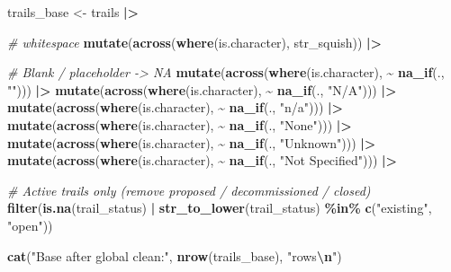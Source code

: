 \documentclass[
]{article}
\newenvironment{Shaded}{\begin{snugshade}}{\end{snugshade}}
\newcommand{\CommentTok}[1]{\textcolor[rgb]{0.56,0.35,0.01}{\textit{#1}}}
\newcommand{\FunctionTok}[1]{\textcolor[rgb]{0.13,0.29,0.53}{\textbf{#1}}}
\newcommand{\NormalTok}[1]{#1}
\newcommand{\OtherTok}[1]{\textcolor[rgb]{0.56,0.35,0.01}{#1}}
\newcommand{\SpecialCharTok}[1]{\textcolor[rgb]{0.81,0.36,0.00}{\textbf{#1}}}
\newcommand{\StringTok}[1]{\textcolor[rgb]{0.31,0.60,0.02}{#1}}
\begin{document}
\begin{Shaded}
\begin{Highlighting}[]
\NormalTok{trails\_base }\OtherTok{\textless{}{-}}\NormalTok{ trails }\SpecialCharTok{|\textgreater{}}
  
  \CommentTok{\# whitespace}
  \FunctionTok{mutate}\NormalTok{(}\FunctionTok{across}\NormalTok{(}\FunctionTok{where}\NormalTok{(is.character), str\_squish)) }\SpecialCharTok{|\textgreater{}}
  
  \CommentTok{\# Blank / placeholder {-}\textgreater{} NA}
  \FunctionTok{mutate}\NormalTok{(}\FunctionTok{across}\NormalTok{(}\FunctionTok{where}\NormalTok{(is.character), }\SpecialCharTok{\textasciitilde{}} \FunctionTok{na\_if}\NormalTok{(., }\StringTok{""}\NormalTok{))) }\SpecialCharTok{|\textgreater{}}
  \FunctionTok{mutate}\NormalTok{(}\FunctionTok{across}\NormalTok{(}\FunctionTok{where}\NormalTok{(is.character), }\SpecialCharTok{\textasciitilde{}} \FunctionTok{na\_if}\NormalTok{(., }\StringTok{"N/A"}\NormalTok{))) }\SpecialCharTok{|\textgreater{}}
  \FunctionTok{mutate}\NormalTok{(}\FunctionTok{across}\NormalTok{(}\FunctionTok{where}\NormalTok{(is.character), }\SpecialCharTok{\textasciitilde{}} \FunctionTok{na\_if}\NormalTok{(., }\StringTok{"n/a"}\NormalTok{))) }\SpecialCharTok{|\textgreater{}}
  \FunctionTok{mutate}\NormalTok{(}\FunctionTok{across}\NormalTok{(}\FunctionTok{where}\NormalTok{(is.character), }\SpecialCharTok{\textasciitilde{}} \FunctionTok{na\_if}\NormalTok{(., }\StringTok{"None"}\NormalTok{))) }\SpecialCharTok{|\textgreater{}}
  \FunctionTok{mutate}\NormalTok{(}\FunctionTok{across}\NormalTok{(}\FunctionTok{where}\NormalTok{(is.character), }\SpecialCharTok{\textasciitilde{}} \FunctionTok{na\_if}\NormalTok{(., }\StringTok{"Unknown"}\NormalTok{))) }\SpecialCharTok{|\textgreater{}}
  \FunctionTok{mutate}\NormalTok{(}\FunctionTok{across}\NormalTok{(}\FunctionTok{where}\NormalTok{(is.character), }\SpecialCharTok{\textasciitilde{}} \FunctionTok{na\_if}\NormalTok{(., }\StringTok{"Not Specified"}\NormalTok{))) }\SpecialCharTok{|\textgreater{}}
  
  \CommentTok{\# Active trails only (remove proposed / decommissioned / closed)}
  \FunctionTok{filter}\NormalTok{(}\FunctionTok{is.na}\NormalTok{(trail\_status) }\SpecialCharTok{|}
           \FunctionTok{str\_to\_lower}\NormalTok{(trail\_status) }\SpecialCharTok{\%in\%} \FunctionTok{c}\NormalTok{(}\StringTok{"existing"}\NormalTok{, }\StringTok{"open"}\NormalTok{))}

\FunctionTok{cat}\NormalTok{(}\StringTok{"Base after global clean:"}\NormalTok{, }\FunctionTok{nrow}\NormalTok{(trails\_base), }\StringTok{"rows}\SpecialCharTok{\textbackslash{}n}\StringTok{"}\NormalTok{)}
\end{Highlighting}
\end{Shaded}
\end{document}
